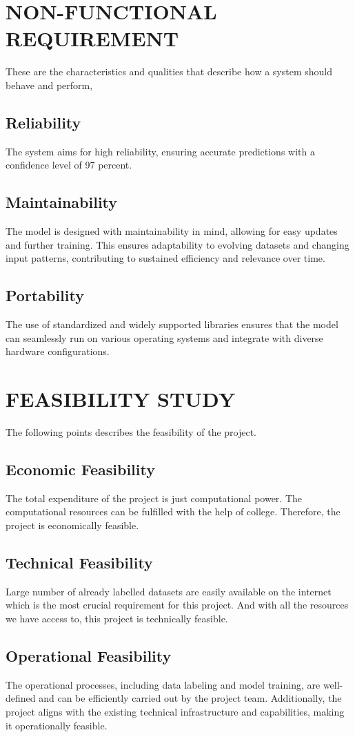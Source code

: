         \section{NON-FUNCTIONAL REQUIREMENT}
            These are the characteristics and qualities that describe how a system should behave and perform,

            \subsection{Reliability}
                The system aims for high reliability, ensuring accurate predictions with a confidence level of 97 percent.
            \subsection{Maintainability}
                The model is designed with maintainability in mind, allowing for easy updates and further training. This ensures adaptability to evolving datasets and changing input patterns, contributing to sustained efficiency and relevance over time.
            \subsection{Portability}
                The use of standardized and widely supported libraries ensures that the model can seamlessly run on various operating systems and integrate with diverse hardware configurations.
            
        \section{FEASIBILITY STUDY}
            The following points describes the feasibility of the project.

            \subsection{Economic Feasibility}
                The total expenditure of the project is just computational power. The computational resources can be fulfilled with the help of college. Therefore, the project is economically feasible.

            \subsection{Technical Feasibility}
                Large number of already labelled datasets are easily available on the internet which is the most crucial requirement for this project. And with all the resources we have access to, this project is technically feasible.

            \subsection{Operational Feasibility}
                The operational processes, including data labeling and model training, are well-defined and can be efficiently carried out by the project team. Additionally, the project aligns with the existing technical infrastructure and capabilities, making it operationally feasible.

            
